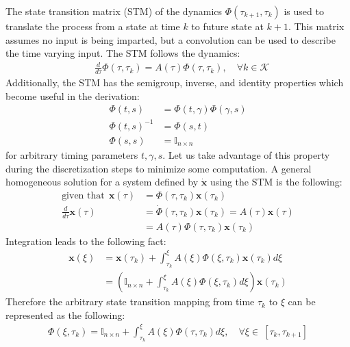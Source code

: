 The state transition matrix (STM) of the dynamics $\Phi(\tau_{k+1},\tau_k)$ is used to translate the process from a state at time $k$ to future state at $k+1$. This matrix assumes no input is being imparted, but a convolution can be used to describe the time varying input. The STM follows the dynamics:
%
\begin{align}
& \frac{d}{d\tau} \Phi(\tau,\tau_k) = A(\tau) \Phi(\tau,\tau_k), \quad \forall k \in \mathcal{K}
\end{align}
Additionally, the STM has the semigroup, inverse, and identity properties which become useful in the derivation:
\begin{align}
	\Phi(t,s) &= \Phi(t, \gamma)\Phi(\gamma, s) \\
	\Phi(t,s)^{-1} &= \Phi(s,t) \\
	\Phi(s,s) &= \mathbb{I}_{n \times n}
\end{align}
for arbitrary timing parameters $t, \gamma, s$. Let us take advantage of this property during the discretization steps to minimize some computation. A general homogeneous solution for a system defined by $\dot{\mathbf{x}}$ using the STM is the following:
%
\begin{align}
	\text{given that} \ \ \mathbf{x}(\tau) &= \Phi(\tau, \tau_k) \mathbf{x}(\tau_k)\\
	\frac{d}{d\tau}\mathbf{x}(\tau) &= \dot{\Phi}(\tau, \tau_k) \mathbf{x}(\tau_k) = A(\tau)\mathbf{x}(\tau) \\ 
	& = A(\tau) \Phi(\tau, \tau_k) \mathbf{x}(\tau_k)
\end{align}
Integration leads to the following fact:
\begin{align}
	\mathbf{x}(\xi) &= \mathbf{x}(\tau_k) + \int_{\tau_k}^\xi A(\xi) \Phi(\xi, \tau_k) \mathbf{x}(\tau_k) d\xi \\
	&= \left( \mathbb{I}_{n\times n} + \int_{\tau_k}^\xi A(\xi) \Phi(\xi, \tau_k) d\xi \right)  \mathbf{x}(\tau_k)
\end{align}
Therefore the arbitrary state transition mapping from time $\tau_k$ to $\xi$ can be represented as the following:
\begin{align}
	\Phi(\xi, \tau_k) = \mathbb{I}_{n\times n} + \int_{\tau_k}^\xi A(\xi) \Phi(\tau, \tau_k) d\xi, \quad \forall \xi \in \ [\tau_k, \tau_{k+1}]
\end{align}

